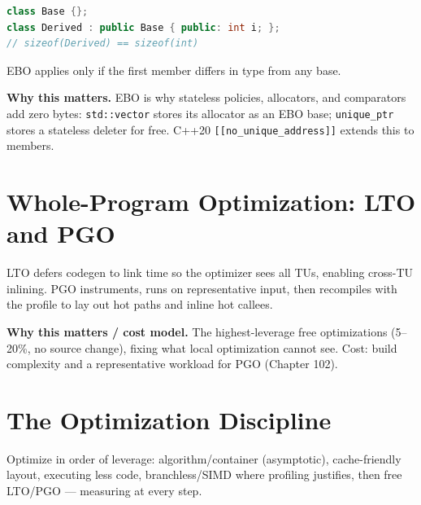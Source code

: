 \begin{lstlisting}[language=C++, caption={EBO collapses an empty base to zero size. Min standard: C++98.}]
class Base {};
class Derived : public Base { public: int i; };
// sizeof(Derived) == sizeof(int)
\end{lstlisting}

EBO applies only if the first member differs in type from any base.

\textbf{Why this matters.} EBO is why stateless policies, allocators, and comparators add zero bytes: \texttt{std::vector} stores its allocator as an EBO base; \texttt{unique\_ptr} stores a stateless deleter for free. C++20 \texttt{[[no\_unique\_address]]} extends this to members.

\section{Whole-Program Optimization: LTO and PGO}
LTO defers codegen to link time so the optimizer sees all TUs, enabling cross-TU inlining. PGO instruments, runs on representative input, then recompiles with the profile to lay out hot paths and inline hot callees.

\textbf{Why this matters / cost model.} The highest-leverage free optimizations (5--20\%, no source change), fixing what local optimization cannot see. Cost: build complexity and a representative workload for PGO (Chapter 102).

\section{The Optimization Discipline}
Optimize in order of leverage: algorithm/container (asymptotic), cache-friendly layout, executing less code, branchless/SIMD where profiling justifies, then free LTO/PGO --- measuring at every step.
